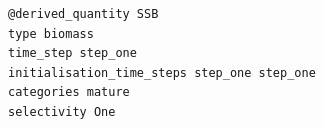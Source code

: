 {\small{\begin{verbatim}
@derived_quantity SSB
type biomass
time_step step_one
initialisation_time_steps step_one step_one
categories mature
selectivity One
\end{verbatim}}}
%
%
%
%

